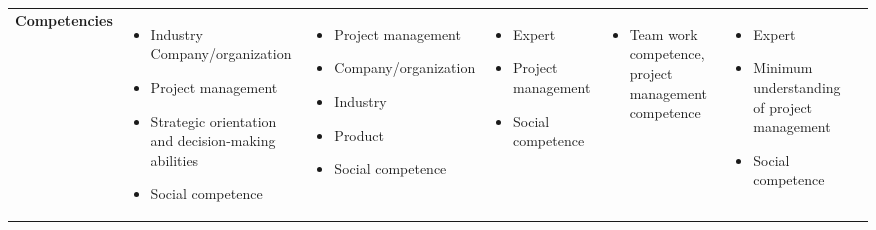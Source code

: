 \begin{table}
\begin{tabularx}{22cm}{X X X X X X r}
        \textbf{Competencies} & 
        \begin{itemize} [noitemsep,topsep=0pt, leftmargin=0pt]
            \item Industry Company/organization
            \item Project management
            \item Strategic orientation and decision-making abilities
            \item Social competence 
        \end{itemize} & 
        \begin{itemize} [noitemsep,topsep=0pt, leftmargin=0pt]
            \item Project management
            \item Company/organization
            \item Industry
            \item Product
            \item Social competence 
        \end{itemize} & 
        \begin{itemize} [noitemsep,topsep=0pt, leftmargin=0pt]
            \item Expert 
            \item Project management
            \item Social competence 
        \end{itemize} & 
        \begin{itemize} [noitemsep,topsep=0pt, leftmargin=0pt]
            \item Team work competence, project management competence 
        \end{itemize} & 
        \begin{itemize} [noitemsep,topsep=0pt, leftmargin=0pt]
            \item Expert
            \item Minimum understanding of project management 
            \item Social competence 
        \end{itemize} & 
         \\
        

\end{tabularx}
\end{table}
